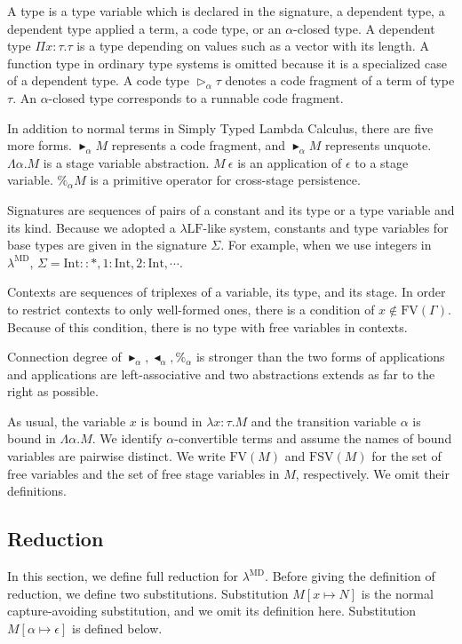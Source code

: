 \documentclass[runningheads]{llncs}
\newcommand{\LMD}{$\lambda^{\textrm{MD}}$\xspace}
\newcommand{\LLF}{$\lambda\textrm{LF}$\xspace}
\newcommand{\G}{\Gamma}
\newcommand{\TW}{\triangleright}
\newcommand{\TB}{\blacktriangleright}
\newcommand{\TBL}{\blacktriangleleft}
\newcommand{\FV}{\text{FV}}
\newcommand{\FTV}{\text{FSV}}
\newcommand{\I}{\textrm{Int}}
\begin{document}
A type is a type variable which is declared in the signature, a dependent type, a dependent type applied a term, a code type, or an $\alpha$-closed type.
A dependent type $\Pi x:\tau.\tau$ is a type depending on values such as a vector with its length.
A function type in ordinary type systems is omitted because it is a specialized case of a dependent type.
A code type $\TW_\alpha \tau$ denotes a code fragment of a term of type $\tau$.
An $\alpha$-closed type corresponds to a runnable code fragment.

In addition to normal terms in Simply Typed Lambda Calculus, there are five more forms.
$\TB_\alpha M$ represents a code fragment, and $\TB_\alpha M$ represents unquote.
$\Lambda\alpha.M$ is a stage variable abstraction.
$M\ \epsilon$ is an application of $\epsilon$ to a stage variable.
$\%_\alpha M$ is a primitive operator for cross-stage persistence.

Signatures are sequences of pairs of a constant and its type or a type variable and its kind.
Because we adopted a \LLF-like system, constants and type variables for base types are given in the signature $\Sigma$.
For example, when we use integers in \LMD, $\Sigma = \I :: *, 1:\I, 2:\I, \cdots$.

Contexts are sequences of triplexes of a variable, its type, and its stage.
In order to restrict contexts to only well-formed ones, there is a condition of $x\notin\FV(\G)$.
Because of this condition, there is no type with free variables in contexts.

Connection degree of $\TB_\alpha, \TBL_\alpha, \%_\alpha$ is stronger than the two forms of applications
and applications are left-associative
and two abstractions extends as far to the right as possible.

As usual, the variable $x$ is bound in $\lambda x:\tau.M$
and the transition variable $\alpha$ is bound in $\Lambda \alpha.M$.
We identify $\alpha$-convertible terms and assume the names of bound variables are pairwise distinct.
We write $\FV(M)$ and $\FTV(M)$ for the set of free variables and the set of free stage variables in $M$, respectively.
We omit their definitions.

\subsection{Reduction}

In this section, we define full reduction for \LMD.
Before giving the definition of reduction, we define two substitutions.
Substitution $M[x\mapsto N]$ is the normal capture-avoiding substitution, and we omit its definition here.
Substitution $M[\alpha \mapsto \epsilon]$ is defined below.
\end{document}
